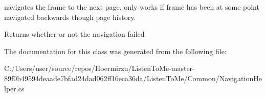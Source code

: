 navigates the frame to the next page. only works if frame has been at some point navigated backwards though page history. 

\begin{DoxyReturn}{Returns}
whether or not the navigation failed
\end{DoxyReturn}


The documentation for this class was generated from the following file\+:\begin{DoxyCompactItemize}
\item 
C\+:/\+Users/user/source/repos/\+Hoermirzu/\+Listen\+To\+Me-\/master-\/89f0b49594deaade7bfad24dad062ff16eca36da/\+Listen\+To\+Me/\+Common/Navigation\+Helper.\+cs\end{DoxyCompactItemize}
